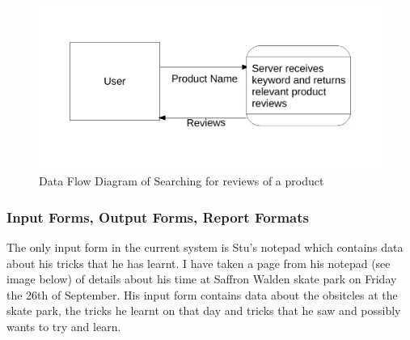\begin{figure}[H]
    \includegraphics[width=\textwidth]{./Analysis/SearchingForReviews.pdf}
    \caption{Data Flow Diagram of Searching for reviews of a product} \label{fig:Searching for a reviews}
\end{figure}

\subsubsection{Input Forms, Output Forms, Report Formats}

The only input form in the current system is Stu's notepad which contains data about his tricks that he has learnt. I have taken a page from his notepad (see image below) of details about his time at Saffron Walden skate park on Friday the 26th of September. His input form contains data about the obsitcles at the skate park, the tricks he learnt on that day and tricks that he saw and possibly wants to try and learn.

